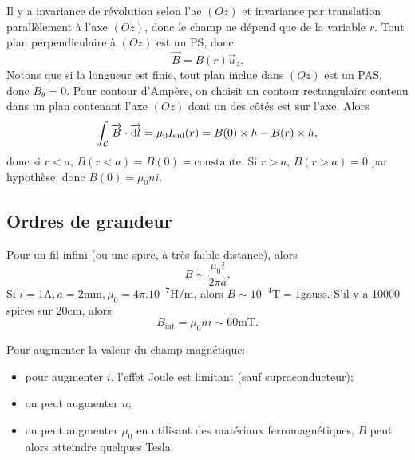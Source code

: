             Il y a invariance de révolution selon l'ae $(Oz)$ et invariance par translation parallèlement à l'axe $(Oz)$, donc le champ ne dépend que de la variable $r$. Tout plan perpendiculaire à $(Oz)$ est un PS, donc 
            \begin{equation}
                \boxed{
                    \vec{B}=B(r)\vec{u}_z.
                }
            \end{equation}
            Notons que si la longueur est finie, tout plan inclue dans $(Oz)$ est un PAS, donc $B_{\theta}=0$. Pour contour d'Ampère, on choisit un contour rectangulaire contenu dans un plan contenant l'axe $(Oz)$ dont un des côtés est sur l'axe. Alors
            \begin{equation}
                \int_{\mathcal{C}}\protect\overrightarrow{{B}}\cdot\protect\overrightarrow{{\mathrm{d} l}}=\mu_{0}I_{\mathrm{enl}}(r)=B(0)\times h - B(r)\times h,
            \end{equation}
            donc si $r<a$, $B(r<a)=B(0)=\mathrm{constante}$. Si $r>a$, $B(r>a)=0$ par hypothèse, donc $B(0)=\mu_0 n i$.

    \subsection{Ordres de grandeur}

        Pour un fil infini (ou une spire, à très faible distance), alors 
        \begin{equation}
            B\sim\frac{\mu_0 i}{2\pi a}.
        \end{equation}
        Si $i=1\si{\ampere},a=2\si{\milli\metre},\mu_0=4\pi.10^{-7}\si{\henry\per\metre}$, alors $B\sim 10^{-4}\si{\tesla}=1\mathrm{gauss}$.
        S'il y a 10000 spires sur 20\si{\centi\metre}, alors 
        \begin{equation}
            B_{\mathrm{int}}=\mu_0 n i\sim 60\si{\milli\tesla}.
        \end{equation}

        Pour augmenter la valeur du champ magnétique:
        \begin{itemize}
            \item pour augmenter $i$, l'effet Joule est limitant (sauf supraconducteur);
            \item on peut augmenter $n$;
            \item on peut augmenter $\mu_0$ en utilisant des matériaux ferromagnétiques, $B$ peut alors atteindre quelques Tesla.
        \end{itemize}

